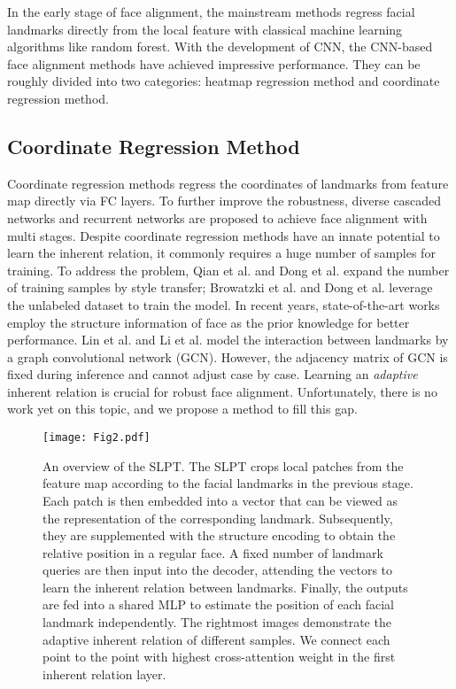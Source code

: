 \documentclass[10pt,twocolumn,letterpaper]{article}
\begin{document}
In the early stage of face alignment, the mainstream methods \cite{CLM, SDM, Face3000, CFSS, SCDF, DAC-CSR, COFW, DCFE} regress facial landmarks directly from the local feature with classical machine learning algorithms like random forest. With the development of CNN, the CNN-based face alignment methods have achieved impressive performance. They can be roughly divided into two categories: heatmap regression method and coordinate regression method. 

\subsection{Coordinate Regression Method}
 Coordinate regression methods \cite{TCDNN, MTCNN, DVLN, Wing} regress the coordinates of landmarks from feature map directly via FC layers. To further improve the robustness, diverse cascaded networks \cite{MDM, DAN} and recurrent networks \cite{RAR} are proposed to achieve face alignment with multi stages. Despite coordinate regression methods have an innate potential to learn the inherent relation, it commonly requires a huge number of samples for training. To address the problem, Qian et al. \cite{AVS} and Dong et al. \cite{SAN} expand the number of training samples by style transfer; Browatzki et al. \cite{3FabRec} and Dong et al. \cite{SRT} leverage the unlabeled dataset to train the model. In recent years, state-of-the-art works employ the structure information of face as the prior knowledge for better performance. Lin et al. \cite{SCDF} and Li et al. \cite{SDL} model the interaction between landmarks by a graph convolutional network (GCN). However, the adjacency matrix of GCN is fixed during inference and cannot adjust case by case. Learning an \textit{adaptive} inherent relation is crucial for robust face alignment. Unfortunately, there is no work yet on this topic, and we propose a method to fill this gap.
 




\begin{figure*}[t!]
	\centering
	\texttt{[image: Fig2.pdf]}
	\caption{An overview of the SLPT. The SLPT crops local patches from the feature map according to the facial landmarks in the previous stage. Each patch is then embedded into a vector that can be viewed as the representation of the corresponding landmark. Subsequently, they are supplemented with the structure encoding to obtain the relative position in a regular face. A fixed number of landmark queries are then input into the decoder, attending the vectors to learn the inherent relation between landmarks. Finally, the outputs are fed into a shared MLP to estimate the position of each facial landmark independently. The rightmost images demonstrate the adaptive inherent relation of different samples. We connect each point to the point with highest cross-attention weight in the first inherent relation layer.}
	\label{fig2}
\end{figure*}
\end{document}
